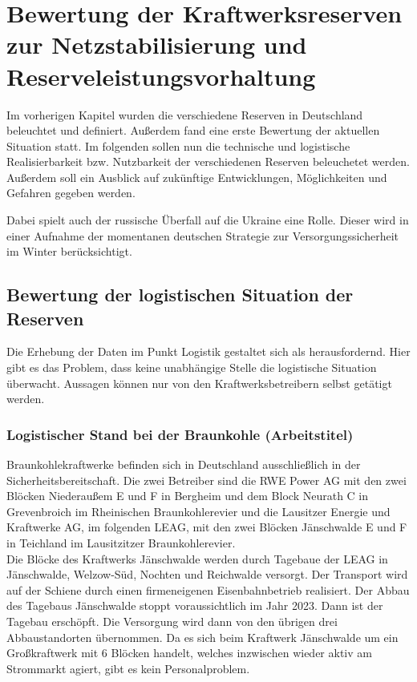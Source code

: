 \section{Bewertung der Kraftwerksreserven zur Netzstabilisierung und Reserveleistungsvorhaltung}

Im vorherigen Kapitel wurden die verschiedene Reserven in Deutschland beleuchtet und definiert. Außerdem fand eine erste Bewertung der aktuellen Situation statt. Im folgenden sollen nun die technische und logistische Realisierbarkeit bzw. Nutzbarkeit der verschiedenen Reserven beleuchetet werden. Außerdem soll ein Ausblick auf zukünftige Entwicklungen, Möglichkeiten und Gefahren gegeben werden.

Dabei spielt auch der russische Überfall auf die Ukraine eine Rolle. Dieser wird in einer Aufnahme der momentanen deutschen Strategie zur Versorgungssicherheit im Winter berücksichtigt.

	\subsection{Bewertung der logistischen Situation der Reserven}
	Die Erhebung der Daten im Punkt Logistik gestaltet sich als herausfordernd. Hier gibt es das Problem, dass keine unabhängige Stelle die logistische Situation überwacht. Aussagen können nur von den Kraftwerksbetreibern selbst getätigt werden.
	
		\subsubsection{Logistischer Stand bei der Braunkohle (Arbeitstitel)} \label{sect: Braunkohle}
	Braunkohlekraftwerke befinden sich in Deutschland ausschließlich in der Sicherheitsbereitschaft. Die zwei Betreiber sind die RWE Power AG mit den zwei Blöcken Niederaußem E und F in Bergheim und dem Block Neurath C in Grevenbroich im Rheinischen Braunkohlerevier und die Lausitzer Energie und Kraftwerke AG, im folgenden LEAG, mit den zwei Blöcken Jänschwalde E und F in Teichland im Lausitzitzer Braunkohlerevier. \cite{Excel_Kraftwerksliste} \\
	
	Die Blöcke des Kraftwerks Jänschwalde werden durch Tagebaue der LEAG in Jänschwalde, Welzow-Süd, Nochten und Reichwalde versorgt. Der Transport wird auf der Schiene durch einen firmeneigenen Eisenbahnbetrieb realisiert. Der Abbau des Tagebaus Jänschwalde stoppt voraussichtlich im Jahr 2023. Dann ist der Tagebau erschöpft. Die Versorgung wird dann von den übrigen drei Abbaustandorten übernommen.
	Da es sich beim Kraftwerk Jänschwalde um ein Großkraftwerk mit 6 Blöcken handelt, welches inzwischen wieder aktiv am Strommarkt agiert, gibt es kein Personalproblem.\cite{LEAG_Braunkohleversorgung} \\
	
